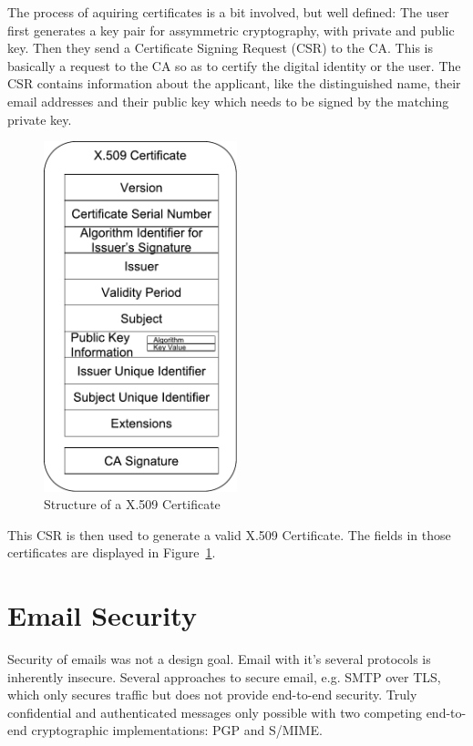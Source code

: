 The process of aquiring certificates is a bit involved, but well defined:
The user first generates a key pair for assymmetric cryptography, with private and public key.
Then they send a Certificate Signing Request (CSR) to the CA.
This is basically a request to the CA so as to certify the digital identity or the user.
The CSR contains information about the applicant, like the distinguished name, their email addresses and their public
key which needs to be signed by the matching private key.

\begin{figure}
    \centering
    \includegraphics[width=0.5\textwidth]{figures/Structure_of_X509.pdf}
    \caption{Structure of a X.509 Certificate~\cite{jagdish2016certservice}}
    \label{fig:x509Structure}
\end{figure}

This CSR is then used to generate a valid X.509 Certificate.
The fields in those certificates are displayed in Figure~\ref{fig:x509Structure}.



\section{Email Security}\label{sec:emailSecurity}

Security of emails was not a design goal.
Email with it's several protocols is inherently insecure.
Several approaches to secure email, e.g. SMTP over TLS, which only secures traffic but does not provide end-to-end
security.
Truly confidential and authenticated messages only possible with two competing end-to-end cryptographic implementations:
PGP and S/MIME.

